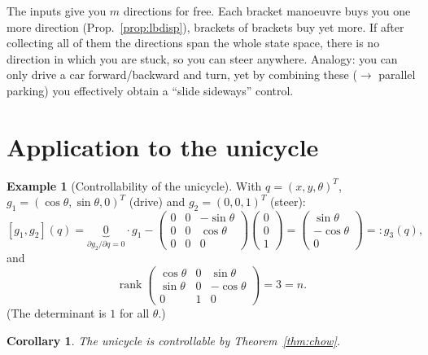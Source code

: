 \documentclass[11pt,a4paper]{article}
\newcommand{\LB}[2]{[#1,#2]}
\DeclareMathOperator{\rank}{rank}
\theoremstyle{plain}
\newtheorem{corollary}[theorem]{Corollary}
\theoremstyle{definition}
\newtheorem{example}[theorem]{Example}
\theoremstyle{remark}
\begin{document}
\begin{intuition}
The inputs give you $m$ directions for free. Each bracket manoeuvre buys you one more direction (Prop.~\ref{prop:lbdisp}), brackets of brackets buy yet more. If after collecting all of them the directions span the whole state space, there is no direction in which you are stuck, so you can steer anywhere. Analogy: you can only drive a car forward/backward and turn, yet by combining these ($\to$ parallel parking) you effectively obtain a ``slide sideways'' control.
\end{intuition}

\section{Application to the unicycle}

\begin{example}[Controllability of the unicycle]
With $q=(x,y,\theta)^T$, $g_1=(\cos\theta,\sin\theta,0)^T$ (drive) and $g_2=(0,0,1)^T$ (steer):
\[
\LB{g_1}{g_2}(q)=\underbrace{0}_{\partial g_2/\partial q=0}\cdot g_1-\begin{pmatrix}0&0&-\sin\theta\\0&0&\cos\theta\\0&0&0\end{pmatrix}\begin{pmatrix}0\\0\\1\end{pmatrix}
=\begin{pmatrix}\sin\theta\\-\cos\theta\\0\end{pmatrix}=:g_3(q),
\]
and
\[
\rank\begin{pmatrix}\cos\theta&0&\sin\theta\\\sin\theta&0&-\cos\theta\\0&1&0\end{pmatrix}=3=n .
\]
(The determinant is $1$ for all $\theta$.)
\end{example}

\begin{corollary}
The unicycle is controllable by Theorem~\ref{thm:chow}.
\end{corollary}
\end{document}

